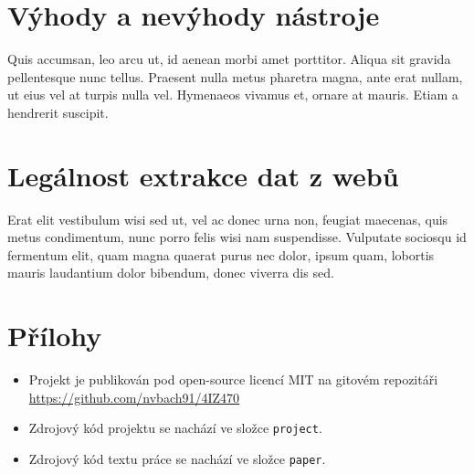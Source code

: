 \documentclass[11pt,a4paper]{article}
\begin{document}
\section{Výhody a nevýhody nástroje}
Quis accumsan, leo arcu ut, id aenean morbi amet porttitor. Aliqua sit gravida pellentesque nunc tellus. Praesent nulla metus pharetra magna, ante erat nullam, ut eius vel at turpis nulla vel. Hymenaeos vivamus et, ornare at mauris. Etiam a hendrerit suscipit.

\section{Legálnost extrakce dat z webů}
Erat elit vestibulum wisi sed ut, vel ac donec urna non, feugiat maecenas, quis metus condimentum, nunc porro felis wisi nam suspendisse. Vulputate sociosqu id fermentum elit, quam magna quaerat purus nec dolor, ipsum quam, lobortis mauris laudantium dolor bibendum, donec viverra dis sed.

\newpage



\section*{Přílohy}
\begin{itemize}
\item Projekt je publikován pod open-source licencí MIT na gitovém repozitáři \\ \url{https://github.com/nvbach91/4IZ470} 
\item Zdrojový kód projektu se nachází ve složce \texttt{project}.
\item Zdrojový kód textu práce se nachází ve složce \texttt{paper}.
\end{itemize}
\end{document}
